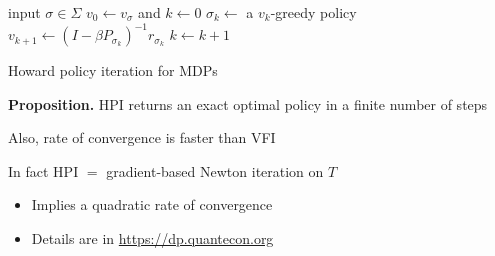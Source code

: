\documentclass[xcolor=dvipsnames]{beamer}
\newcommand{\1}{\mathbbm 1}
\begin{document}
\begin{frame}
        
    {\small
    \begin{algorithm}[H]
        \DontPrintSemicolon
        input $\sigma \in \Sigma$ \;
    \vspace{0.3em}
        $v_0 \leftarrow v_\sigma$ and $k \leftarrow 0$  \;
    \vspace{0.3em}
        \Repeat
        {
            $\sigma_k \leftarrow $ a $v_k$-greedy policy \;
    \vspace{0.3em}
            $v_{k+1} \leftarrow (I - \beta P_{\sigma_k} )^{-1} r_{\sigma_k}$ \;
    \vspace{0.3em}
    \vspace{0.3em}
            $k \leftarrow k + 1$ \;
    \vspace{0.3em}
        }
    \vspace{0.3em}
        \caption{Howard policy iteration for MDPs}
    \end{algorithm}
    }

\end{frame}

\begin{frame}
    
    \begin{block}{}
        {\bf Proposition.} 
            HPI returns an exact optimal policy in a finite number of steps
    \end{block}

    \vspace{0.5em}
    \vspace{0.5em}
    \vspace{0.5em}

    Also, rate of convergence is faster than VFI 

    \vspace{0.5em}
    \vspace{0.5em}

    In fact HPI $=$ gradient-based Newton iteration on $T$
    \vspace{0.5em}

    \begin{itemize}
        \item Implies a quadratic rate of convergence
        \vspace{0.5em}
        \item Details are in \url{https://dp.quantecon.org}
    \end{itemize}


\end{frame}
\end{document}
